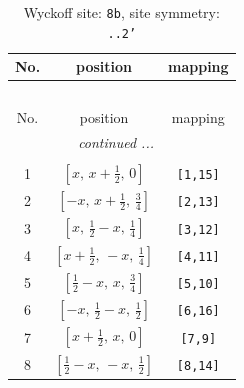 \documentclass[fleqn,8pt]{jsarticle}
\begin{document}
\begin{longtable}{ccc}
\caption{Wyckoff site: {\tt 8b}, site symmetry: {\tt ..2'}}
 \\
 \hline \hline
No. & position & mapping \\ \hline \endfirsthead

\multicolumn{2}{l}{\tablename\ \thetable{}} \\
 \hline \hline
No. & position & mapping \\ \hline \endhead

 \hline \hline
\multicolumn{2}{r}{\footnotesize\it continued ...} \\ \endfoot

 \hline \hline
\multicolumn{2}{r}{} \\ \endlastfoot

1 & $\left[ x,\, x + \frac{1}{2},\, 0 \right]$ & {\tt [1,15]} \\ \hline
2 & $\left[ - x,\, x + \frac{1}{2},\, \frac{3}{4} \right]$ & {\tt [2,13]} \\ \hline
3 & $\left[ x,\, \frac{1}{2} - x,\, \frac{1}{4} \right]$ & {\tt [3,12]} \\ \hline
4 & $\left[ x + \frac{1}{2},\, - x,\, \frac{1}{4} \right]$ & {\tt [4,11]} \\ \hline
5 & $\left[ \frac{1}{2} - x,\, x,\, \frac{3}{4} \right]$ & {\tt [5,10]} \\ \hline
6 & $\left[ - x,\, \frac{1}{2} - x,\, \frac{1}{2} \right]$ & {\tt [6,16]} \\ \hline
7 & $\left[ x + \frac{1}{2},\, x,\, 0 \right]$ & {\tt [7,9]} \\ \hline
8 & $\left[ \frac{1}{2} - x,\, - x,\, \frac{1}{2} \right]$ & {\tt [8,14]} \\
\end{longtable}
\renewcommand{\arraystretch}{1.2}
\end{document}
